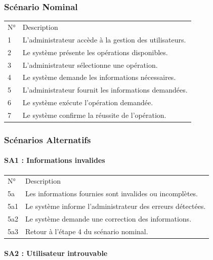 \documentclass[
]{article}
\begin{document}
\hypertarget{scuxe9nario-nominal-5}{%
\subsubsection{Scénario Nominal}\label{scuxe9nario-nominal-5}}

\begin{longtable}[]{@{}ll@{}}
\toprule
\endhead
N° & Description \\
1 & L'administrateur accède à la gestion des utilisateurs. \\
2 & Le système présente les opérations disponibles. \\
3 & L'administrateur sélectionne une opération. \\
4 & Le système demande les informations nécessaires. \\
5 & L'administrateur fournit les informations demandées. \\
6 & Le système exécute l'opération demandée. \\
7 & Le système confirme la réussite de l'opération. \\
\bottomrule
\end{longtable}

\hypertarget{scuxe9narios-alternatifs-5}{%
\subsubsection{Scénarios Alternatifs}\label{scuxe9narios-alternatifs-5}}

\hypertarget{sa1-informations-invalides}{%
\paragraph{SA1 : Informations
invalides}\label{sa1-informations-invalides}}

\begin{longtable}[]{@{}ll@{}}
\toprule
\endhead
N° & Description \\
5a & Les informations fournies sont invalides ou incomplètes. \\
5a1 & Le système informe l'administrateur des erreurs détectées. \\
5a2 & Le système demande une correction des informations. \\
5a3 & Retour à l'étape 4 du scénario nominal. \\
\bottomrule
\end{longtable}

\hypertarget{sa2-utilisateur-introuvable}{%
\paragraph{SA2 : Utilisateur
introuvable}\label{sa2-utilisateur-introuvable}}
\end{document}
